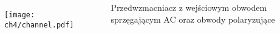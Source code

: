 \begin{frame}{}
    \begin{columns}

    \begin{figure}[H]
        \centering
        \texttt{[image: ch4/channel.pdf]} 
    \end{figure}   


    \begin{block}{
        Przedwzmacniacz z wejściowym obwodem sprzęgającym AC oraz obwody polaryzujące
    }

    \end{block}
    \end{columns}   
  
\end{frame}



